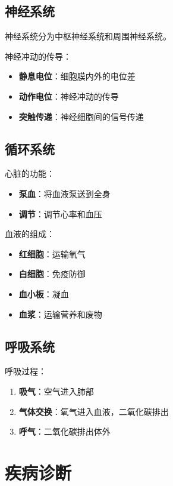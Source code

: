 \documentclass[12pt,UTF8]{ctexbook}
\begin{document}
\section{神经系统}
\label{sec:nervous_system}

神经系统分为中枢神经系统和周围神经系统。

神经冲动的传导：
\begin{itemize}
    \item \textbf{静息电位}：细胞膜内外的电位差
    \item \textbf{动作电位}：神经冲动的传导
    \item \textbf{突触传递}：神经细胞间的信号传递
\end{itemize}

\section{循环系统}
\label{sec:circulatory_system}

心脏的功能：
\begin{itemize}
    \item \textbf{泵血}：将血液泵送到全身
    \item \textbf{调节}：调节心率和血压
\end{itemize}

血液的组成：
\begin{itemize}
    \item \textbf{红细胞}：运输氧气
    \item \textbf{白细胞}：免疫防御
    \item \textbf{血小板}：凝血
    \item \textbf{血浆}：运输营养和废物
\end{itemize}

\section{呼吸系统}
\label{sec:respiratory_system}

呼吸过程：
\begin{enumerate}
    \item \textbf{吸气}：空气进入肺部
    \item \textbf{气体交换}：氧气进入血液，二氧化碳排出
    \item \textbf{呼气}：二氧化碳排出体外
\end{enumerate}

\chapter{疾病诊断}
\label{chap:diagnosis}
\end{document}
